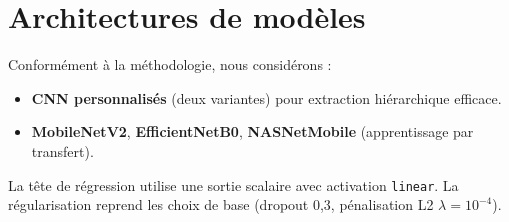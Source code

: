 

\section{Architectures de modèles}
\label{sec:modeles}

Conformément à la méthodologie, nous considérons :
\begin{itemize}
    \item \textbf{CNN personnalisés} (deux variantes) pour extraction hiérarchique efficace.
    \item \textbf{MobileNetV2}, \textbf{EfficientNetB0}, \textbf{NASNetMobile} (apprentissage par transfert).
\end{itemize}
La tête de régression utilise une sortie scalaire avec activation \texttt{linear}. La régularisation reprend les choix de base (dropout 0{,}3, pénalisation L2 \(\lambda=10^{-4}\)).



